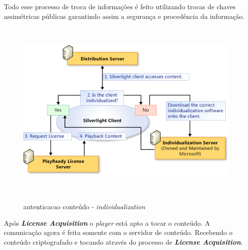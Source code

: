 Todo esse processo de troca de informa\c{c}\~oes \'e feito utilizando trocas de chaves assim\'etricas p\'ublicas garantindo assim a seguran\c{c}a e proced\^encia da informa\c{c}\~ao.
\begin{figure}[H]
\caption{autenticacao conte\'udo - \textit{individualization}}
\includegraphics[height=9cm]{Figuras/autenticacao_conteudo_individualization.png} 
\label{figura:individualization}
\end{figure}
Ap\'os \textbf{\textit{License Acquisition}} o \textit{player} est\'a apto a tocar o conte\'udo. A comunica\c{c}\~ao agora \'e feita somente com o servidor de conte\'udo. Recebendo o conte\'udo criptografado e tocando atrav\'es do processo de \textbf{\textit{License Acquisition}}.